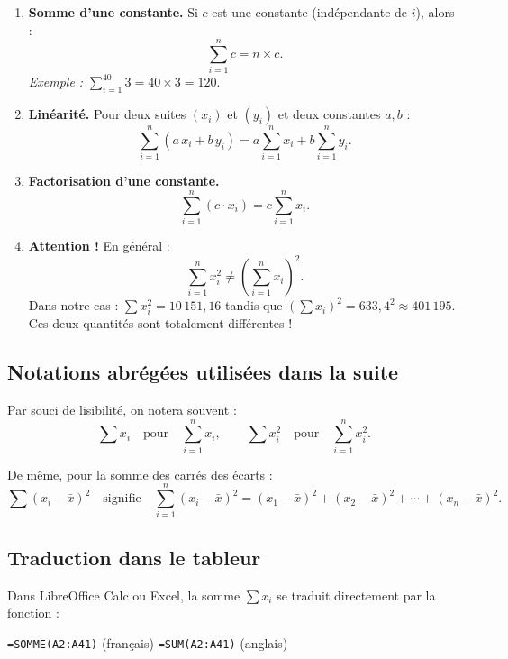 \documentclass[11pt,a4paper]{article}
\newcommand{\fc}[1]{\textcolor{calcform}{\texttt{#1}}}
\begin{document}
\begin{enumerate}[label=\textbf{R\arabic*.}, leftmargin=*]
  \item \textbf{Somme d'une constante.} Si \( c \) est une constante
        (indépendante de \( i \)), alors :
        \[
        \sum_{i=1}^{n} c = n \times c.
        \]
        \emph{Exemple :} \( \sum_{i=1}^{40} 3 = 40 \times 3 = 120 \).

  \item \textbf{Linéarité.} Pour deux suites \( (x_i) \) et \( (y_i) \)
        et deux constantes \( a, b \) :
        \[
        \sum_{i=1}^{n} (a\,x_i + b\,y_i) = a \sum_{i=1}^{n} x_i
        + b \sum_{i=1}^{n} y_i.
        \]

  \item \textbf{Factorisation d'une constante.}
        \[
        \sum_{i=1}^{n} (c \cdot x_i) = c \sum_{i=1}^{n} x_i.
        \]

  \item \textbf{Attention !} En général :
        \[
        \sum_{i=1}^{n} x_i^2 \neq \left(\sum_{i=1}^{n} x_i\right)^{2}.
        \]
        Dans notre cas : \( \sum x_i^2 = 10\,151{,}16 \)
        tandis que \( \left(\sum x_i\right)^2 = 633{,}4^2 \approx 401\,195 \).
        Ces deux quantités sont totalement différentes !
\end{enumerate}

\subsection{Notations abrégées utilisées dans la suite}

Par souci de lisibilité, on notera souvent :
\[
\sum x_i \quad\text{pour}\quad \sum_{i=1}^{n} x_i,
\qquad
\sum x_i^2 \quad\text{pour}\quad \sum_{i=1}^{n} x_i^2.
\]

\noindent De même, pour la somme des carrés des écarts :
\[
\sum (x_i - \bar{x})^2
\quad\text{signifie}\quad
\sum_{i=1}^{n} (x_i - \bar{x})^2
= (x_1-\bar{x})^2 + (x_2-\bar{x})^2 + \cdots + (x_n-\bar{x})^2.
\]

\subsection{Traduction dans le tableur}

Dans LibreOffice Calc ou Excel, la somme \( \sum x_i \) se traduit
directement par la fonction :

\begin{center}
\fc{=SOMME(A2:A41)} \quad (français) \qquad
\fc{=SUM(A2:A41)} \quad (anglais)
\end{center}
\end{document}

